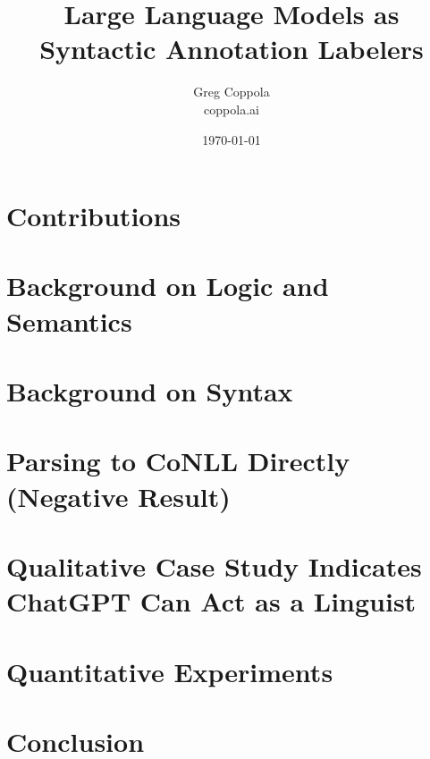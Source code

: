 \documentclass[11pt]{article}
\title{Large Language Models as Syntactic Annotation Labelers}
\author{Greg Coppola\\coppola.ai}
\date{\today}
\begin{document}
\maketitle



\section{Contributions}


\section{Background on Logic and Semantics}


\section{Background on Syntax}


\section{Parsing to CoNLL Directly (Negative Result)}


\section{Qualitative Case Study Indicates ChatGPT Can Act as a Linguist}


\section{Quantitative Experiments}


\section{Conclusion}




\end{document}
